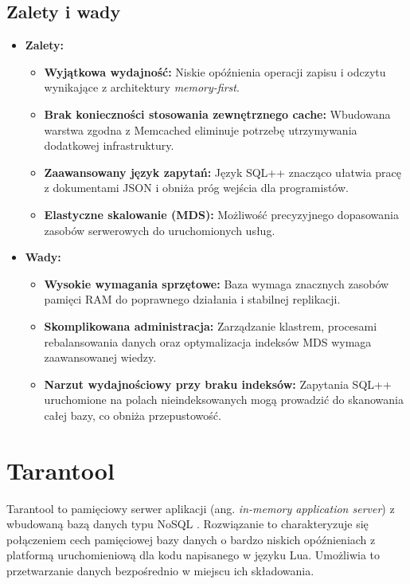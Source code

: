 \subsection{Zalety i wady}
\begin{itemize}
    \item \textbf{Zalety:}
    \begin{itemize}
        \item \textbf{Wyjątkowa wydajność:} Niskie opóźnienia operacji zapisu i odczytu wynikające z architektury \emph{memory-first}.
        \item \textbf{Brak konieczności stosowania zewnętrznego cache:} Wbudowana warstwa zgodna z Memcached eliminuje potrzebę utrzymywania dodatkowej infrastruktury.
        \item \textbf{Zaawansowany język zapytań:} Język SQL++ znacząco ułatwia pracę z dokumentami JSON i obniża próg wejścia dla programistów.
        \item \textbf{Elastyczne skalowanie (MDS):} Możliwość precyzyjnego dopasowania zasobów serwerowych do uruchomionych usług.
    \end{itemize}
    \item \textbf{Wady:}
    \begin{itemize}
        \item \textbf{Wysokie wymagania sprzętowe:} Baza wymaga znacznych zasobów pamięci RAM do poprawnego działania i stabilnej replikacji.
        \item \textbf{Skomplikowana administracja:} Zarządzanie klastrem, procesami rebalansowania danych oraz optymalizacja indeksów MDS wymaga zaawansowanej wiedzy.
        \item \textbf{Narzut wydajnościowy przy braku indeksów:} Zapytania SQL++ uruchomione na polach nieindeksowanych mogą prowadzić do skanowania całej bazy, co obniża przepustowość.
    \end{itemize}
\end{itemize}

\section{Tarantool}
Tarantool to pamięciowy serwer aplikacji (ang. \emph{in-memory application server}) z wbudowaną bazą danych typu NoSQL \cite{tarantool2024}. Rozwiązanie to charakteryzuje się połączeniem cech pamięciowej bazy danych o bardzo niskich opóźnieniach z platformą uruchomieniową dla kodu napisanego w języku Lua. Umożliwia to przetwarzanie danych bezpośrednio w miejscu ich składowania.

